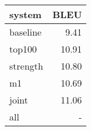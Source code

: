 \begin{tabular}{lr}
\toprule
system & BLEU \\
\toprule
baseline & 9.41\\
top100 & 10.91 \\
strength & 10.80\\
m1 & 10.69 \\ 
joint & 11.06 \\ 
all & - \\
\bottomrule
\end{tabular}